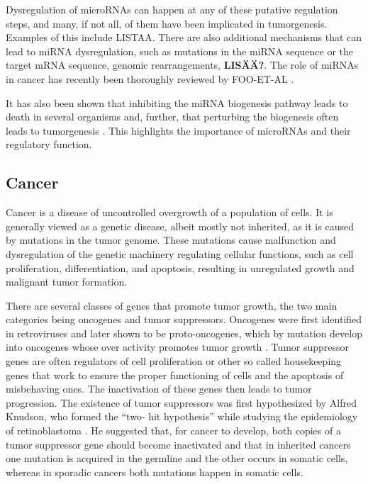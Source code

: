 Dysregulation of microRNAs can happen at any of these putative regulation
steps, and many, if not all, of them have been implicated in tumorgenesis.
Examples of this include LISTAA. There are also additional mechanisms that can
lead to miRNA dysregulation, such as mutations in the miRNA sequence or the
target mRNA sequence, genomic rearrangements,
\textbf{LISÄÄ?}. The role of miRNAs in cancer has recently been
thoroughly reviewed by FOO-ET-AL \citep{CITE}.

It has also been shown that inhibiting the miRNA biogenesis pathway leads to
death in several organisms \citep{CITE} and, further, that perturbing the
biogenesis often leads to tumorgenesis \citep{CITE}. This highlights the
importance of microRNAs and their regulatory function.












\subsection{Cancer}\label{cancer}

Cancer is a disease of uncontrolled overgrowth of a population of cells. It is
generally viewed as a genetic disease, albeit mostly not inherited, as it is
caused by  mutations in the tumor genome. These mutations cause malfunction
and dysregulation of the genetic machinery regulating cellular functions, such
as cell proliferation, differentiation, and apoptosis, resulting in
unregulated growth and malignant tumor formation.

There are several classes of genes that promote tumor growth, the two main
categories being oncogenes and tumor suppressors. Oncogenes were first
identified in retroviruses and later shown to be proto-oncogenes, which by
mutation develop into oncogenes whose over activity promotes tumor growth
\citep{Varmus1988}. Tumor suppressor genes are often regulators of cell
proliferation or other so called housekeeping genes that work to ensure the
proper functioning of cells and the apoptosis of misbehaving ones. The
inactivation of these genes then leads to tumor progression. The existence of
tumor suppressors was first hypothesized by Alfred Knudson, who formed the “two-
hit hypothesis” while studying the epidemiology of retinoblastoma
\citep{Knudson1971}. He suggested that, for cancer to develop, both copies of
a tumor suppressor gene should become inactivated and that in inherited
cancers one mutation is acquired in the germline and the other occurs in
somatic cells, whereas in sporadic cancers both mutations happen in somatic
cells.

